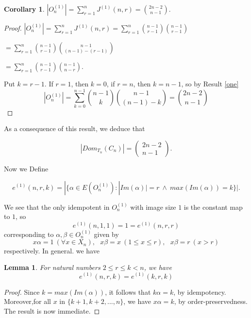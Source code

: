 \documentclass[10pt]{extarticle}
\numberwithin{equation}{section}
\numberwithin{bbb}{section}
\newtheorem{lemma}{Lemma}[section]
\newtheorem{corollary}{Corollary}[section]
\numberwithin{equation}{section}
\begin{document}
\vspace{0.7cm}
\begin{corollary}
   $|O_n^{(1)}|=\sum_{r=1}^{n} J^{(1)}(n,r)=\binom{2n-2}{n-1}.$ 
\end{corollary}
\begin{proof}
   $|O_n^{(1)}|=\sum_{r=1}^{n} J^{(1)}(n,r)=\sum_{r=1}^{n}\binom{n-1}{r-1}\binom{n-1}{r-1}$

\vspace{0.5cm}
   \hspace{4.2cm}
   $=\sum_{r=1}^{n}\binom{n-1}{r-1}\binom{n-1}{(n-1)-(r-1)}$
   
\vspace{0.5cm}
   \hspace{4.2cm}
  $=\sum_{r=1}^{n}\binom{n-1}{r-1}\binom{n-1}{n-r}.$

  \vspace{0.5cm}
Put $k=r-1$. If $r=1$, then $k=0$, if $r=n$, then $k=n-1$, so by Result \ref{one}
$$|O_n^{(1)}|=\sum_{k=0}^{n-1}\binom{n-1}{k}\binom{n-1}{(n-1)-k}=\binom{2n-2}{n-1}$$
\end{proof}

As a consequence of this result, we deduce that

 $$|Dom_{T_n}(C_n)|=\begin{pmatrix} 2n-2 \\ n-1 \end{pmatrix}.$$ 

Now we Define

\begin{equation}
 e^{(1)}(n,r,k)=|\{\alpha \in E(O_n^{(1)}) : |Im(\alpha)|=r \ \wedge \ max(Im(\alpha))=k\}|.   \label{ck3}
\end{equation}

\vspace{0.2cm}
We see that the only idempotent in $O_n^{(1)}$ with image size $1$ is the constant map to $1$, so 
$$e^{(1)}(n,1,1)=1=e^{(1)}(n,r,r)$$
corresponding to $\alpha,\beta \in O_n^{(1)}$ given by
$$x\alpha=1 \ (\forall x\in X_n), \ \ \ x\beta=x \ (1 \leq x \leq r), \ \ \ x\beta=r \ (x>r)$$
respectively. In general. we have

\vspace{0.2cm}
\begin{lemma}\label{e1}
 For natural numbers $2 \leq r \leq k < n$, we have 
 $$e^{(1)}(n,r,k)=e^{(1)}(k,r,k)$$
\end{lemma}
\begin{proof}
  Since $k=max(Im(\alpha))$, it follows that $k\alpha=k$, by idempotency. Moreover,for all $x$  in $\{k+1,k+2,...,n\}$, we have $x\alpha=k$, by order-preservedness. The result is now immediate.
\end{proof}
\end{document}
